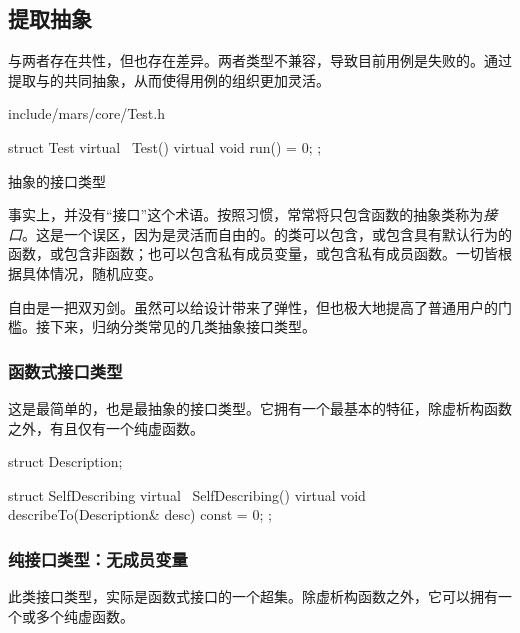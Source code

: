 \begin{content}
\subsection{提取抽象}

与两者存在共性，但也存在差异。两者类型不兼容，导致目前用例是失败的。通过提取与的共同抽象，从而使得用例的组织更加灵活。

\begin{nodiff}{include/mars/core/Test.h}
 \begin{c++}
struct Test {
  virtual ~Test() {}
  virtual void run() = 0;
};
 \end{c++}
\end{nodiff}

\begin{episode}{抽象的接口类型}

\begin{content}

事实上，\cpp{}并没有“接口”这个术语。按照习惯，常常将只包含函数的抽象类称为\emph{接口}。这是一个误区，因为\cpp{}是灵活而自由的。\cpp{}的类可以包含，或包含具有默认行为的函数，或包含非函数；也可以包含私有成员变量，或包含私有成员函数。一切皆根据具体情况，随机应变。

自由是一把双刃剑。虽然可以给设计带来了弹性，但也极大地提高了普通用户的门槛。接下来，归纳分类常见的几类抽象接口类型。

\subsubsection{函数式接口类型}

这是最简单的，也是最抽象的接口类型。它拥有一个最基本的特征，除虚析构函数之外，有且仅有一个纯虚函数。

 \begin{c++}
struct Description;

struct SelfDescribing {
  virtual ~SelfDescribing() {}
  virtual void describeTo(Description& desc) const = 0;
};
 \end{c++}

\subsubsection{纯接口类型：无成员变量}

此类接口类型，实际是函数式接口的一个超集。除虚析构函数之外，它可以拥有一个或多个纯虚函数。


\end{content}
\end{episode}
\end{content}
